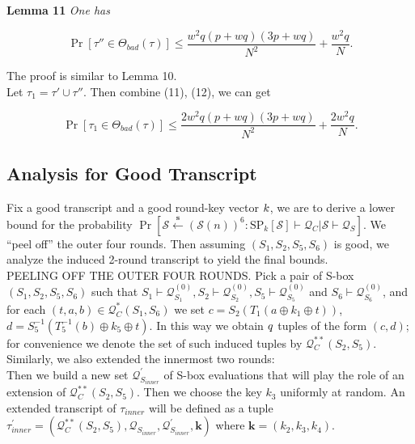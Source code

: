 \noindent \textbf{Lemma 11} \emph{One has}

\begin{equation}
\operatorname{Pr}[\tau'' \in \Theta_{bad}(\tau)] \leq \frac{w^2 q (p+w q) (3 p +w q)}{N^{2}} + \frac{w^{2} q}{N}.
\end{equation}

\noindent The proof is similar to Lemma 10.\\

Let $\tau_{1} = \tau' \cup \tau''$. Then combine (11), (12), we can get

\begin{equation}
\operatorname{Pr}[\tau_{1} \in \Theta_{bad}(\tau)] \leq \frac{2w^2 q (p+w q) (3 p +w q)}{N^{2}} + \frac{2w^{2} q}{N}.
\end{equation}


\subsection{Analysis for Good Transcript}

\noindent Fix a good transcript and a good round-key vector $\mathnormal{k}$, we are to derive a lower bound for the probability  $\operatorname{Pr}\left[\mathcal{S} \stackrel{\mathbf{s}}{\leftarrow}(\mathcal{S}(n))^{6}: \mathrm{SP}_{k}[\mathcal{S}] \vdash \mathcal{Q}_{C} | \mathcal{S} \vdash \mathcal{Q}_{S}\right]$. We ``peel off'' the outer four rounds. Then assuming $(S_{1}, S_2, S_{5}, S_6)$ is good, we analyze the induced 2-round transcript to yield the final bounds.\\

\noindent
\textsc{PEELING OFF THE OUTER FOUR ROUNDS}. Pick a pair of S-box $(S_1, S_2, S_{5}, S_6)$ such that $S_{1} \vdash \mathcal{Q}_{S_{1}}^{(0)}, S_{2} \vdash \mathcal{Q}_{S_{2}}^{(0)}, S_{5} \vdash \mathcal{Q}_{S_{5}}^{(0)}$   and $S_{6} \vdash \mathcal{Q}_{S_{6}}^{(0)}$, and for each $ (t, a, b) \in \mathcal{Q}_{C}^{*}\left(S_{1}, S_{6}\right)$ we set $c=S_{2}\left(T_1\left(a \oplus k_{1} \oplus t\right)\right)$, $d=S_{5}^{-1}\left(T_5^{-1}\left(b\right) \oplus k_{5} \oplus t\right)$. In this way we obtain $\mathnormal{q}$ tuples of the form $(c, d)$; for convenience we denote the set of such induced tuples by $\mathcal{Q}_{C}^{**}\left(S_{2}, S_{5}\right)$. Similarly, we also extended the innermost two rounds:\\

Then we build a new set $\mathcal{Q}_{S_{inner}}^{\prime}$ of S-box evaluations that will play the role of an extension of $\mathcal{Q}_{C}^{**}\left(S_{2}, S_{5}\right)$. Then we choose the key $k_3$ uniformly at random. An extended transcript of $\tau_{inner}$ will be defined as a tuple $\tau_{inner}^{\prime}=\left(\mathcal{Q}_{C}^{**}\left(S_{2}, S_{5}\right), \mathcal{Q}_{S_{inner}}, \mathcal{Q}_{S_{inner}}^{\prime}, \mathbf{k}\right)$ where $\mathbf{k}=\left(k_{2}, k_{3}, k_{4}\right)$.\\

